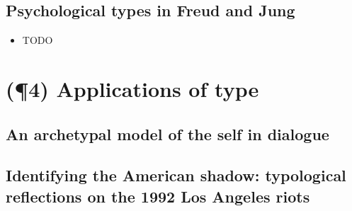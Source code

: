 \subsection{Psychological types in Freud and Jung}

\begin{itemize}

\item TODO

\end{itemize}

\section{(\P4) Applications of type}



\subsection{An archetypal model of the self in dialogue}

\subsection{Identifying the American shadow: typological reflections on the 1992 Los Angeles riots}
